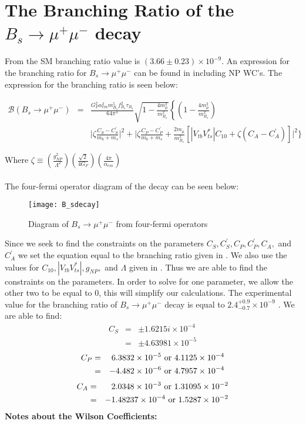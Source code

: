\documentclass[12pt]{article}
\def \bea{\begin{eqnarray}}
\def \eea{\end{eqnarray}}
\def \({\left(}
\def \){\right)}
\def \lb{\left\{}
\def \nn{\nonumber}
\def \nl{\nn \\}
\def \al{\alpha}
\begin{document}
\section{The Branching Ratio of the $B_s \rightarrow \mu^+\mu^-$ decay}
From \cite{CMS:2014xfa} the SM branching ratio value is $(3.66 \pm 0.23) \times 10 ^ {-9}$. An expression for the branching ratio for $B_s \rightarrow \mu^+\mu^-$ can be found in \cite{Dighe:2012df} including NP WC's. The expression for the branching ratio is seen below:
\begin{center}
\bea
\mathcal{B}(B_s\rightarrow \mu^+\mu^-) &=& \frac{G_F^2 \al_{em}^2 m_{B_s}^5 f_{B_s}^2 \tau_{B_s}}{64\pi^3}\sqrt{1-\frac{4m_\mu^2}{m_{B_s}^2}} \lb\(1-\frac{4m_\mu^2}{m_{B_s}^2}\) \right. \nl 
&& \bigg|\zeta\frac{C_S-C_S^{'}}{m_b+m_s}\bigg|^2+\bigg|\zeta\frac{C_P-C_P^{'}}{m_b+m_s}+\frac{2m_\mu}{m_{B_s}^2}[|V_{tb} V_{ts}^*|C_{10}+\zeta (C_A-C_A^{'})]\bigg|^2\bigg\}
\eea
\end{center}
Where $\zeta \equiv (\frac{g_{NP}^2}{\Lambda^2})(\frac{\sqrt{2}}{4G_F})(\frac{4\pi}{\alpha_{em}})$\\
\\
The four-fermi operator diagram of the decay can be seen below: 
\begin{figure}[h]
\centering
\texttt{[image: B\_sdecay]}
\caption{Diagram of $B_s \rightarrow \mu^+ \mu^-$ from four-fermi operators}
\end{figure}
Since we seek to find the constraints on the parameters $C_S, C_S^{'},C_P, C_P^{'},C_A,$ and $C_A^{'}$ we set the equation equal to the branching ratio given in \cite{flavio}. We also use the values for $C_{10},|V_{tb} V_{ts}^*|, g_{NP},$ and $\Lambda$ given in \cite{Dighe:2012df}. Thus we are able to find the constraints on the parameters. In order to solve for one parameter, we allow the other two to be equal to 0, this will simplify our calculations. 
The experimental value for the branching ratio of $B_s\rightarrow \mu^+\mu^- $ decay is equal to $2.4_{-0.7}^{+0.9} \times 10^{-9}$ \cite{Agashe:2014kda}. We are able to find:
\bea
C_S&=& \pm 1.6215i \times 10^{-4} \nl
&=& \pm 4.63981\times 10^{-5}\nn
\eea
\bea
C_P&=& 6.3832 \times 10^{-5}~ {\rm or}~ 4.1125\times 10^{-4}\nl
&=&-4.482\times 10^{-6}~ {\rm or}~ 4.7957\times 10^{-4}\nn
\eea
\bea
C_A&=& 2.0348\times 10^{-3}~ {\rm or}~ 1.31095\times 10^{-2}\nl
&=& -1.48237\times 10^{-4} ~ {\rm or}~ 1.5287\times 10^{-2}\nn
\eea
\textbf{Notes about the Wilson Coefficients:}\\
\end{document}
